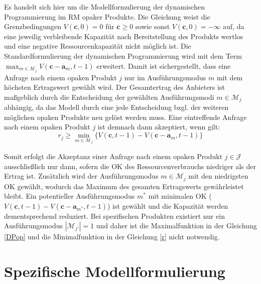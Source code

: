 Es handelt sich hier um die Modellformulierung der dynamischen Programmierung im RM opaker Produkte. Die Gleichung weist die Grenzbedingungen $V(\textbf{c},0)=0$ für $\textbf{c}\ge0$ sowie sonst $V(\textbf{c},0)=-\infty$ auf, da eine jeweilig verbleibende Kapazität nach Bereitstellung des Produkts wertlos und eine negative Ressourcenkapazität nicht möglich ist. Die Standardformulierung der dynamischen Programmierung wird mit dem Term $\max_{m\in\mathcal{M}_{j}}V(\textbf{c}-\textbf{a}_{m},t-1)$ erweitert. Damit ist sichergestellt, dass eine Anfrage nach einem opaken Produkt $j$ nur im Ausführungsmodus $m$ mit dem höchsten Ertragswert gewählt wird. Der Gesamtertrag des Anbieters ist maßgeblich durch die Entscheidung der gewählten Ausführungs\-modi $m\in\mathcal{M}_{j}$ abhängig, da das Modell durch eine jede Entscheidung bzgl. der weiteren möglichen opaken Produkte neu gelöst werden muss. Eine eintreffende Anfrage nach einem opaken Produkt $j$ ist demnach dann akzeptiert, wenn gilt:
\begin{equation}\label{r}
r_{j}\ge\min_{m\in\mathcal{M}_{j}}\bigl\{V(\textbf{c},t-1)-V(\textbf{c}-\textbf{a}_{m},t-1)\bigr\}
\end{equation}


Somit erfolgt die Akzeptanz einer Anfrage nach einem opaken Produkt $j\in\mathcal{J}$ ausschließlich nur dann, sofern die OK des Ressourcenverbrauchs niedriger als der Ertrag ist. Zusätzlich wird der Ausführungsmodus $m\in\mathcal{M}_{j}$ mit den niedrigsten OK gewählt, wodurch das Maximum des gesamten Ertragswerts gewährleistet bleibt. Ein potentieller Ausführungs\-modus $m^{*}$ mit minimalen OK ($V(\textbf{c},t-1)-V(\textbf{c}-\textbf{a}_{m^{*}},t-1)$) ist gewählt und die Kapazität werden dementsprechend reduziert. Bei spezifischen Produkten existiert nur ein Ausführungsmodus $|\mathcal{M}_{j'}|=1$ und daher ist die Maximalfunktion in der Gleichung \eqref{DPop} und die Minimalfunktion in der Gleichung \eqref{r} nicht notwendig.
\section{Spezifische Modellformulierung}
